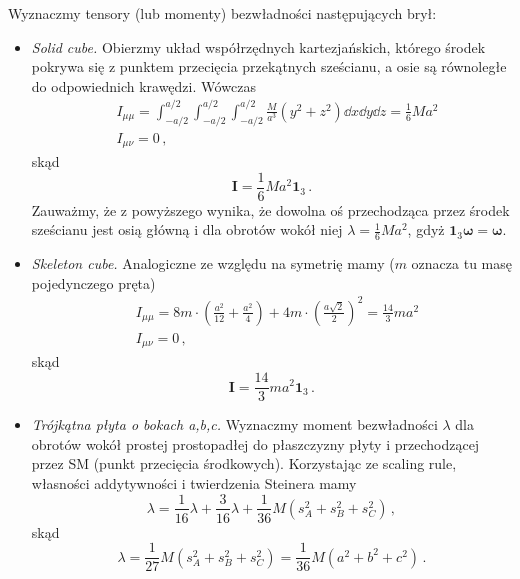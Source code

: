 \documentclass[../main.tex]{subfiles}
\begin{document}
Wyznaczmy tensory (lub momenty) bezwładności następujących brył:
\begin{itemize}
    \item \textit{Solid cube.} Obierzmy układ współrzędnych kartezjańskich, którego środek pokrywa się z punktem przecięcia przekątnych sześcianu, a osie są równoległe do odpowiednich krawędzi. Wówczas
    \begin{equation*}
        \begin{split}
            &I_{\mu\mu}=\int_{-a/2}^{a/2}\int_{-a/2}^{a/2}\int_{-a/2}^{a/2} \frac{M}{a^3} (y^2+z^2)\dd{x}\dd{y}\dd{z}=\frac{1}{6}Ma^2\\
            &I_{\mu\nu}=0\,,
        \end{split}
    \end{equation*}
    skąd
    \begin{equation*}
        \mathbf{I}=\frac{1}{6}Ma^2\mathbf{1}_3\,.
    \end{equation*}
    Zauważmy, że z powyższego wynika, że dowolna oś przechodząca przez środek sześcianu jest osią główną i dla obrotów wokół niej \(\lambda=\frac{1}{6}Ma^2\), gdyż \(\mathbf{1}_3\boldsymbol{\omega}=\boldsymbol{\omega}\).
    
    \item \textit{Skeleton cube.} Analogiczne ze względu na symetrię mamy (\(m\) oznacza tu masę pojedynczego pręta)
    \begin{equation*}
    \begin{split}
        &I_{\mu\mu}=8m\cdot\left(\frac{a^2}{12}+\frac{a^2}{4}\right)+4m\cdot\left(\frac{a\sqrt{2}}{2}\right)^2=\frac{14}{3}ma^2\\
        &I_{\mu\nu}=0\,,
    \end{split}
    \end{equation*}
    skąd
    \begin{equation*}
        \mathbf{I}=\frac{14}{3}ma^2\mathbf{1}_3\,.
    \end{equation*}
    \item \textit{Trójkątna płyta o bokach a,b,c.} Wyznaczmy moment bezwładności \(\lambda\) dla obrotów wokół prostej prostopadłej do płaszczyzny płyty i przechodzącej przez SM (punkt przecięcia środkowych). Korzystając ze scaling rule, własności addytywności i twierdzenia Steinera mamy
    \begin{equation*}
        \lambda=\frac{1}{16}\lambda+\frac{3}{16}\lambda+\frac{1}{36}M(s_A^2+s_B^2+s_C^2)\,,
    \end{equation*}
    skąd
    \begin{equation*}
        \lambda=\frac{1}{27}M(s_A^2+s_B^2+s_C^2)=\frac{1}{36}M(a^2+b^2+c^2)\,.
    \end{equation*}
\end{itemize}
\end{document}
